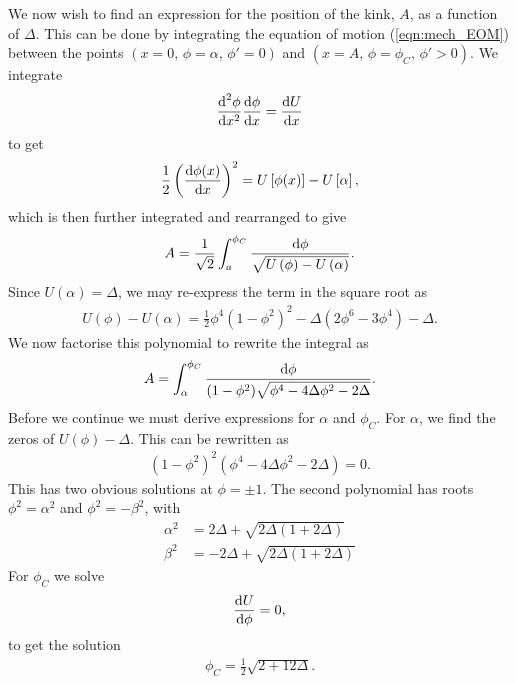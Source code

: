 \documentclass[11pt, oneside]{article}  	%
\numberwithin{equation}{section}
\newcommand{\drv}{\ensuremath{\textup{d}}}
\begin{document}
We now wish to find an expression for the position of the kink, $A$,  as a function of $\Delta$. This can be done by integrating the equation of motion (\ref{eqn:mech_EOM}) between the points $(x = 0,\, \phi = \alpha,\, \phi' = 0)$ and $(x = A ,\, \phi = \phi_C,\, \phi' >0 )$. We integrate
\begin{align}\label{eqn:int_eom}
    \frac{\drv^2 \phi}{\drv x^2} \frac{\drv \phi}{\drv x} = \frac{\drv U}{\drv x }
\end{align}
to get
\begin{align}
    \frac{1}{2} \left(\frac{\drv \phi(x)}{\drv x}\right)^2 = U\left [ \phi(x) \right ]- U\left [ \alpha\right ],
\end{align}
which is then further integrated and rearranged to give
\begin{align}\label{eqn:main_integral}
    A = \frac{1}{\sqrt{2}}\int_{a}^{\phi_C}\frac{\drv \phi}{\sqrt{U\left( \phi \right ) -  U\left( \alpha \right ) }}.
\end{align}
Since $U\left( \alpha \right ) = \Delta$, we may re-express the term in the square root as
\begin{align}
    U\left( \phi \right ) -  U\left( \alpha \right ) = \frac{1}{2}\phi^4 \left (1-\phi^2 \right )^2 - \Delta \left (  2 \phi^6 - 3\phi^4\right) - \Delta.
\end{align}
We now factorise this polynomial to rewrite the integral as
\begin{align}\label{eqn:integral_kink_antikink}
    A =  \int_{\alpha}^{\phi_C} \frac{\drv \phi}{ (1-\phi^2) \sqrt{\phi^4 - 4\Delta \phi^2 -2\Delta } }.
\end{align}
Before we continue we must derive expressions for $\alpha$ and $\phi_C$. For $\alpha$, we find the zeros of $U(\phi) - \Delta$. This can be rewritten as
\begin{align}
    \left (1-\phi^2 \right )^2 \left (\phi^4  - 4\Delta \phi^2 -2\Delta \right ) = 0.
\end{align}
This has two obvious solutions at $\phi = \pm1$. The second polynomial has roots $\phi^2 = \alpha^2$ and $\phi^2 = -\beta^2$, with
\begin{align}
    \alpha^2 &= 2\Delta + \sqrt{2\Delta(1+2\Delta)}\\
    \beta^2 &= -2\Delta + \sqrt{2\Delta(1+2\Delta)}
\end{align}
For $\phi_C$ we solve
\begin{align}
    \frac{\drv U }{\drv \phi} = 0,
\end{align}
to get the solution
\begin{align}\label{eqn:phi_C}
    \phi_C = \frac{1}{2}\sqrt{ 2 + 12\Delta}.
\end{align}
\end{document}
